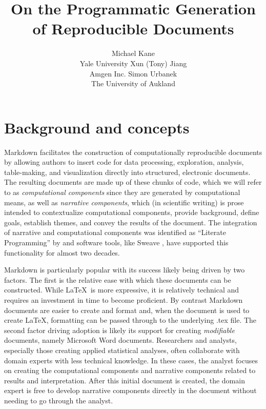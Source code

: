 \documentclass[
]{jss}
\author{
Michael Kane\\Yale University \And Xun (Tony) Jiang\\Amgen
Inc. \And Simon Urbanek\\The University of Aukland
}
\title{On the Programmatic Generation of Reproducible Documents}
\begin{document}
\hypertarget{background-and-concepts}{%
\section{Background and concepts}\label{background-and-concepts}}

 Markdown \citep{baumer2014} facilitates the construction of
computationally reproducible documents by allowing authors to insert
 code for data processing, exploration, analysis,
table-making, and visualization directly into structured, electronic
documents. The resulting documents are made up of these chunks of
 code, which we will refer to as \emph{computational
components} since they are generated by computational means, as well as
\emph{narrative components}, which (in scientific writing) is prose
intended to contextualize computational components, provide background,
define goals, establish themes, and convey the results of the document.
The integration of narrative and computational components was identified
as ``Literate Programming'' by \citet{knuth1984} and software tools,
like Sweave \citep{leisch2002}, have supported this functionality for
almost two decades.

 Markdown is particularly popular with its success likely
being driven by two factors. The first is the relative ease with which
these documents can be constructed. While \LaTeX ~is more expressive, it
is relatively technical and requires an investment in time to become
proficient. By contrast  Markdown documents are easier to
create and format and, when the document is used to create \LaTeX,
formatting can be passed through to the underlying .tex file. The second
factor driving adoption is likely its support for creating
\emph{modifiable} documents, namely Microsoft Word documents.
Researchers and analysts, especially those creating applied statistical
analyses, often collaborate with domain experts with less technical
knowledge. In these cases, the analyst focuses on creating the
computational components and narrative components related to results and
interpretation. After this initial document is created, the domain
expert is free to develop narrative components directly in the document
without needing to go through the analyst.
\end{document}
